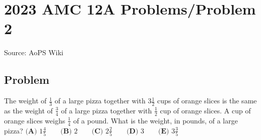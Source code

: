 \documentclass[12pt]{article}
\begin{document}
\section*{{2023 AMC 12A Problems/Problem 2}}
Source: AoPS Wiki

\subsection*{Problem}
The weight of $\frac{1}{3}$ of a large pizza together with $3 \frac{1}{2}$ cups of orange slices is the same as the weight of $\frac{3}{4}$ of a large pizza together with $\frac{1}{2}$ cup of orange slices. A cup of orange slices weighs $\frac{1}{4}$ of a pound. What is the weight, in pounds, of a large pizza? $\textbf{(A) }1\frac{4}{5}\qquad\textbf{(B) }2\qquad\textbf{(C) }2\frac{2}{5}\qquad\textbf{(D) }3\qquad\textbf{(E) }3\frac{3}{5}$
\end{document}
